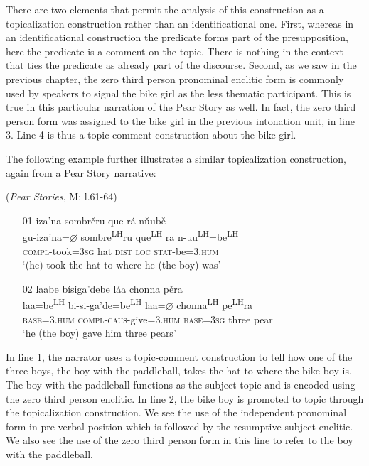 There are two elements that permit the analysis of this construction as a topicalization construction rather than an identificational one. First, whereas in an identificational construction the predicate forms part of the presupposition, here the predicate is a comment on the topic. There is nothing in the context that ties the predicate as already part of the discourse. Second, as we saw in the previous chapter, the zero third person pronominal enclitic form is commonly used by speakers to signal the bike girl as the less thematic participant. This is true in this particular narration of the Pear Story as well. In fact, the zero third person form was assigned to the bike girl in the previous intonation unit, in line 3. Line 4 is thus a topic-comment construction about the bike girl.



The following example further illustrates a similar topicalization construction, again from a Pear Story narrative:

\ea\label{topicalization2} (\textit{Pear Stories}, M: l.61-64)

\begin{itemize}


\item[01] 
\glll iza'na sombr\v{e}ru que r\'{a} n\v{u}ub\v{e}  \\
gu-iza'na=$\varnothing$ sombre\textsuperscript{LH}ru que\textsuperscript{LH} ra n-uu\textsuperscript{LH}=be\textsuperscript{LH}  \\
\textsc{compl}-took=\textsc{3sg} hat \textsc{dist} \textsc{loc} \textsc{stat}-be=\textsc{3.hum}  \\
\glt `(he) took the hat to where he (the boy) was'


\item[02]
\glll laabe b\'{i}siga'debe l\'{a}a chonna p\v{e}ra  \\
laa=be\textsuperscript{LH} bi-si-ga'de=be\textsuperscript{LH} laa=$\varnothing$ chonna\textsuperscript{LH} pe\textsuperscript{LH}ra  \\
\textsc{base}=\textsc{3.hum} \textsc{compl}-\textsc{caus}-give=\textsc{3.hum} \textsc{base}=\textsc{3sg} three pear  \\
\glt `he (the boy) gave him three pears' 

\end{itemize}
\z
In line 1, the narrator uses a topic-comment construction to tell how one of the three boys, the boy with the paddleball, takes the hat to where the bike boy is. The boy with the paddleball functions as the subject-topic and is encoded using the zero third person enclitic. In line 2, the bike boy is promoted to topic through the topicalization construction. We see the use of the independent pronominal form in pre-verbal position which is followed by the resumptive subject enclitic. We also see the use of the zero third person form in this line to refer to the boy with the paddleball. 



